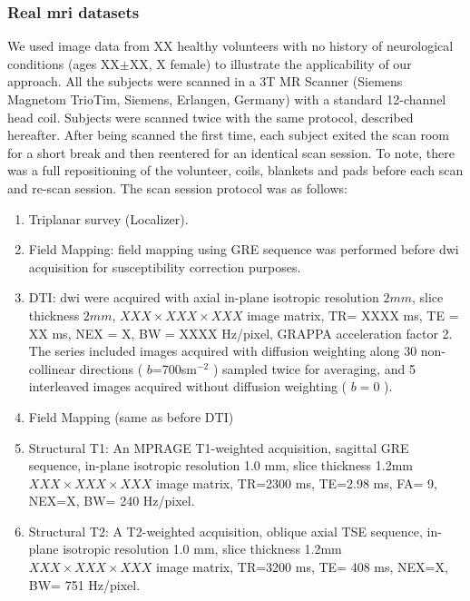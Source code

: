 \subsubsection{Real \gls{mri} datasets} %
%
We used image data from XX healthy volunteers with no history of neurological
conditions (ages XX$\pm$XX, X female) to illustrate the applicability of our
approach. All the subjects were scanned in a 3T MR Scanner (Siemens Magnetom
TrioTim, Siemens, Erlangen, Germany) with a standard 12-channel head coil.
Subjects were scanned twice with the same protocol,
described hereafter. After being scanned the first time, each subject exited the
scan room for a short break and then reentered for an identical scan session.
To note, there was a full repositioning of the volunteer, coils, blankets and pads
before each scan and re-scan session. The scan session protocol was as follows:
\begin{enumerate}
\item Triplanar survey (Localizer).
\item Field Mapping: field mapping using GRE sequence was performed before \gls{dwi}
acquisition for susceptibility correction purposes.
\item DTI: \gls{dwi} were acquired with axial in-plane
isotropic resolution $2mm$, slice thickness $2mm$, $XXX \times XXX \times XXX$
image matrix, TR= XXXX ms, TE = XX ms, NEX = X, BW = XXXX Hz/pixel, GRAPPA
acceleration factor 2. The series included images acquired with diffusion
weighting along 30 non-collinear directions ( $b$=700sm$^{-2}$ ) sampled
twice for averaging, and 5 interleaved images acquired without diffusion
weighting ( $b=0$ ).
\item Field Mapping (same as before DTI)
\item Structural T1: An MPRAGE T1-weighted acquisition, sagittal
GRE sequence, in-plane isotropic resolution 1.0 mm, slice thickness 1.2mm
$XXX \times XXX \times XXX$ image matrix, TR=2300 ms, TE=2.98 ms, FA= 9, NEX=X, BW= 240 Hz/pixel.
\item Structural T2: A T2-weighted acquisition, oblique axial
TSE sequence, in-plane isotropic resolution 1.0 mm, slice thickness 1.2mm
$XXX \times XXX \times XXX$ image matrix, TR=3200 ms, TE= 408 ms, NEX=X, BW= 751 Hz/pixel.
\end{enumerate}


